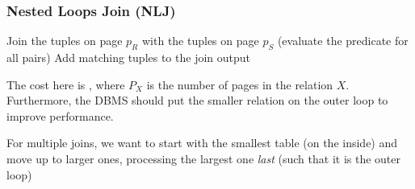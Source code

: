 \subsubsection{Nested Loops Join (NLJ)}
\begin{algorithm}
    \caption{Nested Loops Join Algorithm}
    \begin{algorithmic}[1]
                    \State Join the tuples on page $p_R$ with the tuples on page $p_S$ (evaluate the predicate for all pairs)
                    \State Add matching tuples to the join output
                \EndFor
            \EndFor
        \EndProcedure
    \end{algorithmic}
\end{algorithm}

The cost here is , where $P_X$ is the number of pages in the relation $X$.
Furthermore, the DBMS should put the smaller relation on the outer loop to improve performance.

For multiple joins, we want to start with the smallest table (on the inside) and move up to larger ones, processing the largest one \textit{last} (such that it is the outer loop)
